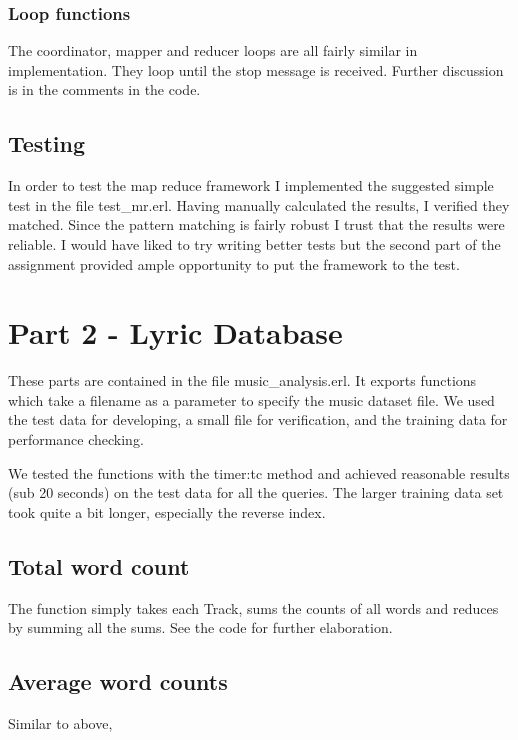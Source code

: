 \documentclass{article}
\begin{document}
\subsubsection{Loop functions}
The coordinator, mapper and reducer loops are all fairly similar in implementation. They loop until the stop message is received. Further discussion is in the comments in the code.

\subsection{Testing}
In order to test the map reduce framework I implemented the suggested simple test in the file test\_mr.erl. Having manually calculated the results, I verified they matched. Since the pattern matching is fairly robust I trust that the results were reliable. I would have liked to try writing better tests but the second part of the assignment provided ample opportunity to put the framework to the test.

\section{Part 2 - Lyric Database}
These parts are contained in the file music\_analysis.erl. It exports functions which take a filename as a parameter to specify the music dataset file. We used the test data for developing, a small file for verification, and the training data for performance checking.

We tested the functions with the timer:tc method and achieved reasonable results (sub 20 seconds) on the test data for all the queries. The larger training data set took quite a bit longer, especially the reverse index.

\subsection{Total word count}
The function simply takes each Track, sums the counts of all words and reduces by summing all the sums. See the code for further elaboration.
\subsection{Average word counts}
Similar to above,
\end{document}

